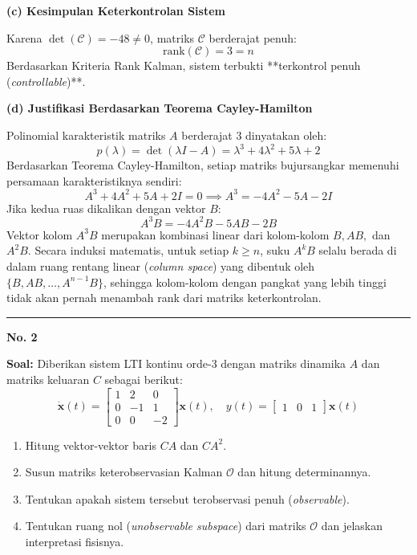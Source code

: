 \documentclass[11pt,a4paper]{article}
\begin{document}
\textbf{(c) Kesimpulan Keterkontrolan Sistem}

Karena $\det(\mathcal{C}) = -48 \ne 0$, matriks $\mathcal{C}$ berderajat penuh:
$$\text{rank}(\mathcal{C}) = 3 = n$$
Berdasarkan Kriteria Rank Kalman, sistem terbukti **terkontrol penuh (\textit{controllable})**.

\textbf{(d) Justifikasi Berdasarkan Teorema Cayley-Hamilton}

Polinomial karakteristik matriks $A$ berderajat 3 dinyatakan oleh:
$$p(\lambda) = \det(\lambda I - A) = \lambda^3 + 4\lambda^2 + 5\lambda + 2$$
Berdasarkan Teorema Cayley-Hamilton, setiap matriks bujursangkar memenuhi persamaan karakteristiknya sendiri:
$$A^3 + 4A^2 + 5A + 2I = 0 \implies A^3 = -4A^2 - 5A - 2I$$
Jika kedua ruas dikalikan dengan vektor $B$:
$$A^3 B = -4A^2 B - 5AB - 2B$$
Vektor kolom $A^3 B$ merupakan kombinasi linear dari kolom-kolom $B, AB,$ dan $A^2 B$. Secara induksi matematis, untuk setiap $k \ge n$, suku $A^k B$ selalu berada di dalam ruang rentang linear (\textit{column space}) yang dibentuk oleh $\{B, AB, \dots, A^{n-1}B\}$, sehingga kolom-kolom dengan pangkat yang lebih tinggi tidak akan pernah menambah rank dari matriks keterkontrolan.

\vspace{12pt}
\hrule
\vspace{10pt}

\textbf{\large No. 2}

\textbf{Soal:}  
Diberikan sistem LTI kontinu orde-3 dengan matriks dinamika $A$ dan matriks keluaran $C$ sebagai berikut:
$$\dot{\mathbf{x}}(t) = \begin{bmatrix} 1 & 2 & 0 \\ 0 & -1 & 1 \\ 0 & 0 & -2 \end{bmatrix} \mathbf{x}(t), \quad y(t) = \begin{bmatrix} 1 & 0 & 1 \end{bmatrix} \mathbf{x}(t)$$
\begin{enumerate}[label=(\alph*)]
    \item Hitung vektor-vektor baris $CA$ dan $CA^2$.
    \item Susun matriks keterobservasian Kalman $\mathcal{O}$ dan hitung determinannya.
    \item Tentukan apakah sistem tersebut terobservasi penuh (\textit{observable}).
    \item Tentukan ruang nol (\textit{unobservable subspace}) dari matriks $\mathcal{O}$ dan jelaskan interpretasi fisisnya.
\end{enumerate}
\end{document}
